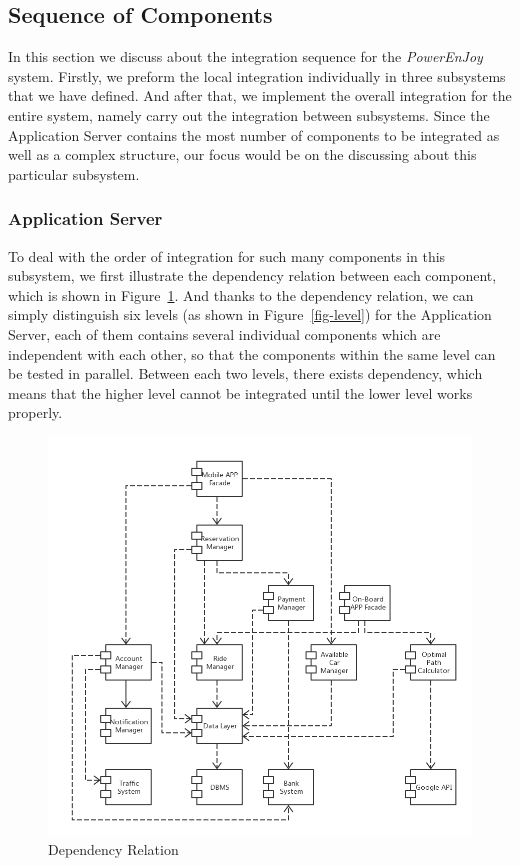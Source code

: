 \documentclass[a4paper,11pt]{article}
\begin{document}
	\subsection{Sequence of Components}
	In this section we discuss about the integration sequence for the \textsl{PowerEnJoy} system. Firstly, we preform the local integration individually in three subsystems that we have defined. And after that, we implement the overall integration for the entire system, namely carry out the integration between subsystems. Since the Application Server contains the most number of components to be integrated as well as a complex structure, our focus would be on the discussing about this particular subsystem. 
	\subsubsection{Application Server}
	To deal with the order of integration for such many components in this subsystem, we first illustrate the dependency relation between each component, which is shown in Figure~\ref{fig-dep}. And thanks to the dependency relation, we can simply distinguish six levels (as shown in Figure~\ref{fig-level}) for the Application Server, each of them contains several individual components which are independent with each other, so that the components within the same level can be tested in parallel. Between each two levels, there exists dependency, which means that the higher level cannot be integrated until the lower level works properly. 
		\begin{figure}[H]
   			\centering
  			\includegraphics[width=\textwidth]{images/dep}
  	    		\caption{Dependency Relation}\label{fig-dep}
		\end{figure}
\end{document}
